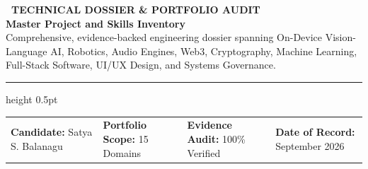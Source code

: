 \documentclass[10pt,a4paper]{article}
\begin{document}
\begin{tcolorbox}[
  enhanced,
  colback=primary,
  colframe=primary,
  arc=5pt,
  boxrule=0pt,
  left=14pt, right=14pt, top=14pt, bottom=14pt,
  after skip=10pt
]
  {\scriptsize\bfseries\color{accent!30!white}\ TECHNICAL DOSSIER \& PORTFOLIO AUDIT}\\[4pt]
  {\fontsize{20pt}{23pt}\selectfont\bfseries\color{white} Master Project and Skills Inventory}\\[4pt]
  {\small\color{slate!20!white} Comprehensive, evidence-backed engineering dossier spanning On-Device Vision-Language AI, Robotics, Audio Engines, Web3, Cryptography, Machine Learning, Full-Stack Software, UI/UX Design, and Systems Governance.}\\[6pt]
  \par\vspace{4pt}
  {\color{white!30!gray}\hrule height 0.5pt}
  \par\vspace{6pt}
  \noindent
  \begin{tabularx}{\textwidth}{@{}XXXX@{}}
    {\footnotesize\color{accent!40!white}\textbf{Candidate:} \color{white}Satya S. Balanagu} &
    {\footnotesize\color{accent!40!white}\textbf{Portfolio Scope:} \color{white}15 Domains} &
    {\footnotesize\color{accent!40!white}\textbf{Evidence Audit:} \color{white}100\% Verified} &
    {\footnotesize\color{accent!40!white}\textbf{Date of Record:} \color{white}September 2026}
  \end{tabularx}
\end{tcolorbox}
\end{document}

